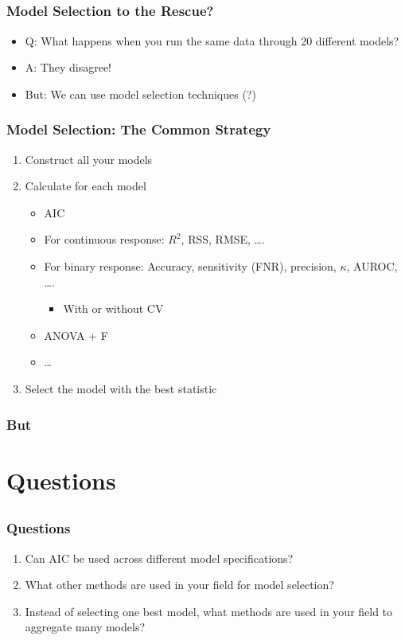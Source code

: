 \documentclass{philslides}
\begin{document}
\subsection*{}
\frame
{
	\frametitle{Model Selection to the Rescue?}
	\begin{itemize}
	\item Q: What happens when you run the same data through 20 different models?  
	\item A: They disagree!  
	\item But:  We can use model selection techniques (?)
	\end{itemize}
}
\frame
{
	\frametitle{Model Selection: The Common Strategy}
	\begin{enumerate}
	\item Construct all your models
	\item Calculate  for each model
		\begin{itemize}
		\item AIC
		\item For continuous response:  $R^2$, RSS, RMSE, \ldots.
		\item For binary response:  Accuracy, sensitivity (FNR), precision, $\kappa$, AUROC, \ldots.
			\begin{itemize}
			\item With or without CV
			\end{itemize}
		\item ANOVA + F
		\item \ldots
		\end{itemize}
	\item Select the model with the best statistic
	\end{enumerate}
}
\frame
{
	\frametitle{But}
}


\section{Questions}
\subsection*{}
\frame
{
	\frametitle{Questions}
	\begin{enumerate}
	\item Can AIC be used across different model specifications? 
	\item What other methods are used in your field for model selection?  
	\item Instead of selecting one best model, what methods are used in your field to aggregate many models?  
	\end{enumerate}
}




\section*{}
\frame
{
	\titlepage
}

\end{document}
